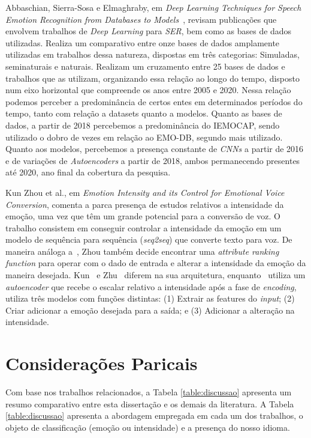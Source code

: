 Abbaschian, Sierra-Sosa e Elmaghraby, em \textit{Deep Learning Techniques for Speech Emotion Recognition from Databases to Models}~\cite{32}, revisam publicações que envolvem trabalhos de \textit{Deep Learning} para \textit{SER}, bem como as bases de dados utilizadas. Realiza um comparativo entre onze bases de dados amplamente utilizadas em trabalhos dessa natureza, dispostas em três categorias: Simuladas, seminaturais e naturais. Realizam um cruzamento entre 25 bases de dados e trabalhos que as utilizam, organizando essa relação ao longo do tempo, disposto num eixo horizontal que compreende os anos entre 2005 e 2020. Nessa relação podemos perceber a predominância de certos entes em determinados períodos do tempo, tanto com relação a datasets quanto a modelos. Quanto as bases de dados, a partir de 2018 percebemos a predominância do IEMOCAP, sendo utilizado o dobro de vezes em relação ao EMO-DB, segundo mais utilizado. Quanto aos modelos, percebemos a presença constante de \textit{CNNs} a partir de 2016 e de variações de \textit{Autoencoders} a partir de 2018, ambos permanecendo presentes até 2020, ano final da cobertura da pesquisa.

Kun Zhou et al., em \textit{Emotion Intensity and its Control for Emotional Voice Conversion}\cite{18}, comenta a parca presença de estudos relativos a intensidade da emoção, uma vez que têm um grande potencial para a conversão de voz. O trabalho consistem em conseguir controlar a intensidade da emoção em um modelo de sequência para sequência (\textit{seq2seq}) que converte texto para voz. De maneira análoga a~\cite{63}, Zhou também decide encontrar uma \textit{attribute ranking function} para operar com o dado de entrada e alterar a intensidade da emoção da maneira desejada. Kun~\cite{18} e Zhu~\cite{63} diferem na sua arquitetura, enquanto~\cite{63} utiliza um \textit{autoencoder} que recebe o escalar relativo a intensidade após a fase de \textit{encoding},~\cite{18} utiliza três modelos com funções distintas: (1) Extrair as features do \textit{input}; (2) Criar adicionar a emoção desejada para a saída; e (3) Adicionar a alteração na intensidade.  %

\section{Considerações Paricais}

Com base nos trabalhos relacionados, a Tabela \ref{table:discussao} apresenta um resumo comparativo entre esta dissertação e os demais da literatura. A Tabela \ref{table:discussao} apresenta a abordagem empregada em cada um dos trabalhos, o objeto de classificação (emoção ou intensidade) e a presença do nosso idioma.

